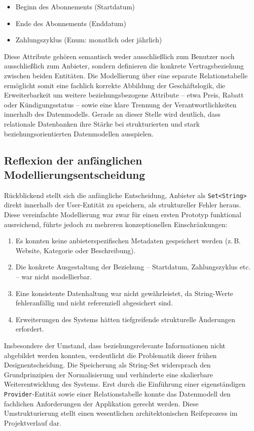\begin{itemize}
    \item Beginn des Abonnements (Startdatum)
    \item Ende des Abonnements (Enddatum)
    \item Zahlungszyklus (Enum: monatlich oder jährlich)
\end{itemize}

Diese Attribute gehören semantisch weder ausschließlich zum Benutzer noch
ausschließlich zum Anbieter, sondern definieren die konkrete Vertragsbeziehung
zwischen beiden Entitäten. Die Modellierung über eine separate Relationstabelle
ermöglicht somit eine fachlich korrekte Abbildung der Geschäftslogik, die
Erweiterbarkeit um weitere beziehungsbezogene Attribute -- etwa Preis, Rabatt
oder Kündigungsstatus -- sowie eine klare Trennung der Verantwortlichkeiten
innerhalb des Datenmodells. Gerade an dieser Stelle wird deutlich, dass
relationale Datenbanken ihre Stärke bei strukturierten und stark
beziehungsorientierten Datenmodellen ausspielen.


\subsection{Reflexion der anfänglichen Modellierungsentscheidung}

Rückblickend stellt sich die anfängliche Entscheidung, Anbieter als
\texttt{Set<String>} direkt innerhalb der User-Entität zu speichern, als
struktureller Fehler heraus. Diese vereinfachte Modellierung war zwar für einen
ersten Prototyp funktional ausreichend, führte jedoch zu mehreren konzeptionellen
Einschränkungen:

\begin{enumerate}
    \item Es konnten keine anbieterspezifischen Metadaten gespeichert werden
    (z.\,B. Website, Kategorie oder Beschreibung).
    \item Die konkrete Ausgestaltung der Beziehung -- Startdatum, Zahlungszyklus
    etc. -- war nicht modellierbar.
    \item Eine konsistente Datenhaltung war nicht gewährleistet, da String-Werte
    fehleranfällig und nicht referenziell abgesichert sind.
    \item Erweiterungen des Systems hätten tiefgreifende strukturelle Änderungen
    erfordert.
\end{enumerate}

Insbesondere der Umstand, dass beziehungsrelevante Informationen nicht abgebildet
werden konnten, verdeutlicht die Problematik dieser frühen Designentscheidung.
Die Speicherung als String-Set widersprach den Grundprinzipien der Normalisierung
und verhinderte eine skalierbare Weiterentwicklung des Systems. Erst durch die
Einführung einer eigenständigen \texttt{Provider}-Entität sowie einer
Relationstabelle konnte das Datenmodell den fachlichen Anforderungen der
Applikation gerecht werden. Diese Umstrukturierung stellt einen wesentlichen
architektonischen Reifeprozess im Projektverlauf dar.

